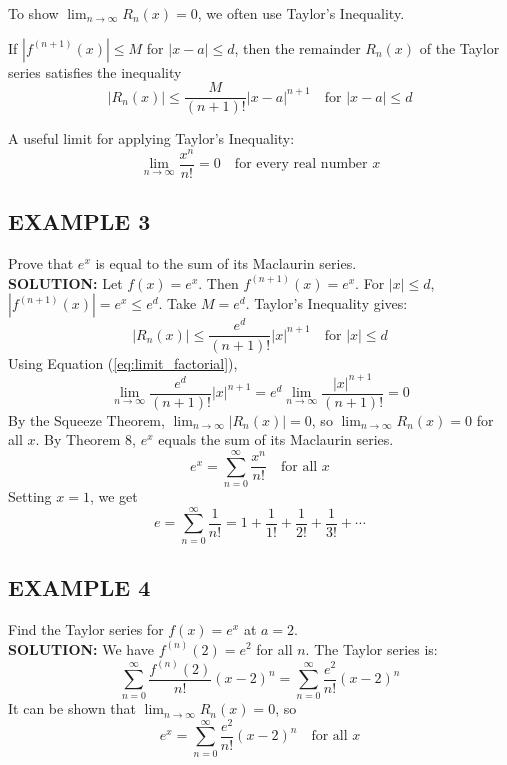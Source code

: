 \documentclass{article}
\theoremstyle{mystyle}
\begin{document}
To show \(\lim_{n\to\infty} R_n(x) = 0\), we often use Taylor's Inequality.

\begin{tcolorbox}[
    colback=white,
    colframe=orange!80!white,
    title=Theorem 5,
    boxrule=0.5mm,
    arc=3mm
    ]
    If \(|f^{(n+1)}(x)| \le M\) for \(|x-a| \le d\), then the remainder \(R_n(x)\) of the Taylor series satisfies the inequality
    \[ |R_n(x)| \le \dfrac{M}{(n+1)!} |x-a|^{n+1} \quad \text{for } |x-a| \le d \]
\end{tcolorbox}

A useful limit for applying Taylor's Inequality:
\begin{equation}
 \lim_{n\to\infty} \dfrac{x^n}{n!} = 0 \quad \text{for every real number } x \label{eq:limit_factorial}
\end{equation}

\subsection*{EXAMPLE 3}
Prove that \(e^x\) is equal to the sum of its Maclaurin series.\\
\textbf{SOLUTION:}
Let \(f(x) = e^x\). Then \(f^{(n+1)}(x) = e^x\). For \(|x| \le d\), \(|f^{(n+1)}(x)| = e^x \le e^d\). Take \(M=e^d\). Taylor's Inequality gives:
\[ |R_n(x)| \le \dfrac{e^d}{(n+1)!} |x|^{n+1} \quad \text{for } |x| \le d \]
Using Equation (\ref{eq:limit_factorial}),
\[ \lim_{n\to\infty} \dfrac{e^d}{(n+1)!} |x|^{n+1} = e^d \lim_{n\to\infty} \dfrac{|x|^{n+1}}{(n+1)!} = 0 \]
By the Squeeze Theorem, \(\lim_{n\to\infty} |R_n(x)| = 0\), so \(\lim_{n\to\infty} R_n(x) = 0\) for all \(x\). By Theorem 8, \(e^x\) equals the sum of its Maclaurin series.
\begin{equation}
 e^x = \sum_{n=0}^{\infty} \dfrac{x^n}{n!} \quad \text{for all } x \label{eq:ex_maclaurin}
\end{equation}
Setting \(x=1\), we get
\begin{equation}
 e = \sum_{n=0}^{\infty} \dfrac{1}{n!} = 1 + \dfrac{1}{1!} + \dfrac{1}{2!} + \dfrac{1}{3!} + \cdots \label{eq:e_series}
\end{equation}

\subsection*{EXAMPLE 4}
Find the Taylor series for \(f(x) = e^x\) at \(a=2\).\\
\textbf{SOLUTION:}
We have \(f^{(n)}(2) = e^2\) for all \(n\). The Taylor series is:
\[ \sum_{n=0}^{\infty} \dfrac{f^{(n)}(2)}{n!} (x-2)^n = \sum_{n=0}^{\infty} \dfrac{e^2}{n!} (x-2)^n \]
It can be shown that \(\lim_{n\to\infty} R_n(x) = 0\), so
\begin{equation}
 e^x = \sum_{n=0}^{\infty} \dfrac{e^2}{n!} (x-2)^n \quad \text{for all } x \label{eq:ex_taylor_a2}
\end{equation}
\end{document}
